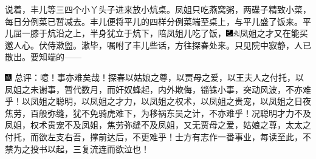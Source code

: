 说着，丰儿等三四个小丫头子进来放小炕桌。凤姐只吃燕窝粥，两碟子精致小菜，每日分例菜已暂减去。丰儿便将平儿的四样分例菜端至桌上，与平儿盛了饭来。平儿屈一膝于炕沿之上，半身犹立于炕下，陪凤姐儿吃了饭，{\includegraphics[width=3mm]{../Images/00003}\includegraphics[width=3mm]{../Images/00012}\footnotesize \kaishu 凤姐之才又在能买邀人心。}伏侍漱盥。漱毕，嘱咐了丰儿些话，方往探春处来。只见院中寂静，人已散出。要知端的------

{\includegraphics[width=3mm]{../Images/00005}  \kaishu 总评：噫！事亦难矣哉！探春以姑娘之尊，以贾母之爱，以王夫人之付托，以凤姐之未谢事，暂代数月，而奸奴蜂起，内外欺侮，锱铢小事，突动风波，不亦难乎！以凤姐之聪明，以凤姐之才力，以凤姐之权术，以凤姐之贵宠，以凤姐之日夜焦劳，百般弥缝，犹不免骑虎难下，为移祸东吴之计，不亦难乎！况聪明才力不及凤姐，权术贵宠不及凤姐，焦劳弥缝不及凤姐，又无贾母之爱，姑娘之尊，太太之付托，而欲左支右吾，撑前达后，不更难乎！士方有志作一番事业，每读至此，不禁为之投书以起，三复流连而欲泣也！}
